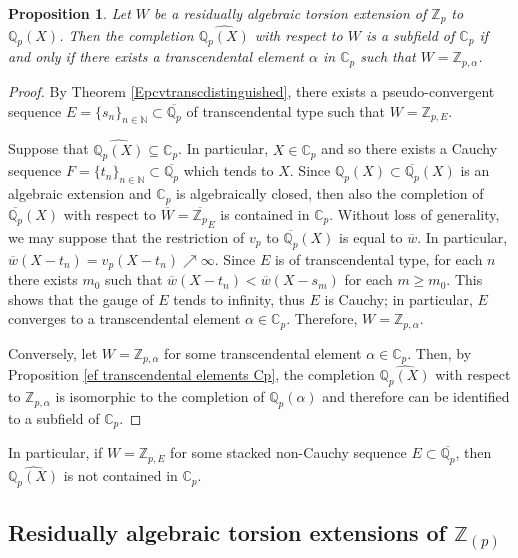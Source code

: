 \documentclass[10pt]{article}
\numberwithin{equation}{section}
\newtheorem{Prop}[equation]{Proposition}
\theoremstyle{definition}\newtheorem{Def}[equation]{Definition}
\theoremstyle{definition}\newtheorem{Ques}[equation]{Question}
\newcommand{\Q}{\mathbb{Q}}
\newcommand{\N}{\mathbb{N}}
\newcommand{\Z}{\mathbb{Z}}
\newcommand{\C}{\mathbb{C}}
\newcommand{\oQp}{\overline{\Q_p}}
\begin{document}
\begin{Prop}\label{completion rat Qp}
Let $W$ be a residually algebraic torsion extension of $\Z_p$ to $\Q_p(X)$. Then the completion $\widehat{\Q_p(X)}$ with respect to $W$ is a subfield of $\C_p$ if and only if there exists a transcendental element $\alpha$ in $\C_p$ such that $W=\Z_{p,\alpha}$.
\end{Prop}
\begin{proof}
By Theorem \ref{Epcvtranscdistinguished}, there exists a pseudo-convergent  sequence $E=\{s_n\}_{n\in\N}\subset\oQp$ of transcendental type such that $W=\Z_{p,E}$. 



Suppose that $\widehat{\Q_p(X)}\subseteq\C_p$. In particular, $X\in\C_p$ and so there exists a Cauchy sequence $F=\{t_n\}_{n\in\N}\subset\oQp$ which tends to $X$. Since $\Q_p(X)\subset\oQp(X)$ is an algebraic extension and $\C_p$ is algebraically closed, then also the completion of $\oQp(X)$ with respect to $\overline{W}=\overline{\Z_p}_E$ is contained in $\C_p$. Without loss of generality, we may suppose that the restriction of $v_p$ to $\oQp(X)$ is equal to $\overline w$. In particular, $\overline{w}(X-t_n)=v_p(X-t_n)\nearrow\infty$. Since $E$ is of transcendental type, for each $n$ there exists $m_0$ such that $\overline{w}(X-t_n)<\overline{w}(X-s_m)$ for each $m\geq m_0$. This shows that the gauge of $E$ tends to infinity, thus $E$ is Cauchy; in particular, $E$ converges to a transcendental element $\alpha\in\C_p$. Therefore, $W=\Z_{p,\alpha}$.

Conversely, let $W=\Z_{p,\alpha}$ for some transcendental element $\alpha\in\C_p$. Then, by Proposition \ref{ef transcendental elements Cp}, the completion $\widehat{\Q_p(X)}$ with respect to $\Z_{p,\alpha}$ is isomorphic to the completion of $\Q_p(\alpha)$ and therefore can be identified to a subfield of $\C_p$.
\end{proof} 
In particular, if $W=\Z_{p,E}$ for some stacked non-Cauchy sequence $E\subset\oQp$, then $\widehat{\Q_p(X)}$ is not contained in $\C_p$.


\subsection{Residually algebraic torsion extensions of $\Z_{(p)}$}\label{RatZpQX}
\end{document}
